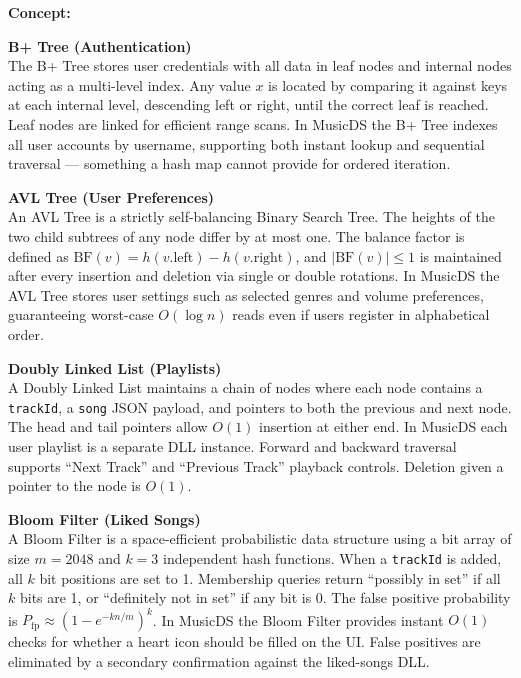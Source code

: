 \documentclass[12pt, a4paper]{article}
\begin{document}

\textbf{Concept:}

\textbf{B+ Tree (Authentication)}\\
The B+ Tree stores user credentials with all data in leaf nodes and internal nodes acting as a multi-level index. Any value $x$ is located by comparing it against keys at each internal level, descending left or right, until the correct leaf is reached. Leaf nodes are linked for efficient range scans. In MusicDS the B+ Tree indexes all user accounts by username, supporting both instant lookup and sequential traversal --- something a hash map cannot provide for ordered iteration.

\textbf{AVL Tree (User Preferences)}\\
An AVL Tree is a strictly self-balancing Binary Search Tree. The heights of the two child subtrees of any node differ by at most one. The balance factor is defined as $\text{BF}(v) = h(v.\text{left}) - h(v.\text{right})$, and $|\text{BF}(v)| \leq 1$ is maintained after every insertion and deletion via single or double rotations. In MusicDS the AVL Tree stores user settings such as selected genres and volume preferences, guaranteeing worst-case $O(\log n)$ reads even if users register in alphabetical order.

\textbf{Doubly Linked List (Playlists)}\\
A Doubly Linked List maintains a chain of nodes where each node contains a \texttt{trackId}, a \texttt{song} JSON payload, and pointers to both the previous and next node. The head and tail pointers allow $O(1)$ insertion at either end. In MusicDS each user playlist is a separate DLL instance. Forward and backward traversal supports ``Next Track'' and ``Previous Track'' playback controls. Deletion given a pointer to the node is $O(1)$.

\textbf{Bloom Filter (Liked Songs)}\\
A Bloom Filter is a space-efficient probabilistic data structure using a bit array of size $m = 2048$ and $k = 3$ independent hash functions. When a \texttt{trackId} is added, all $k$ bit positions are set to 1. Membership queries return ``possibly in set'' if all $k$ bits are 1, or ``definitely not in set'' if any bit is 0. The false positive probability is $P_{\text{fp}} \approx (1 - e^{-kn/m})^k$. In MusicDS the Bloom Filter provides instant $O(1)$ checks for whether a heart icon should be filled on the UI. False positives are eliminated by a secondary confirmation against the liked-songs DLL.
\end{document}
